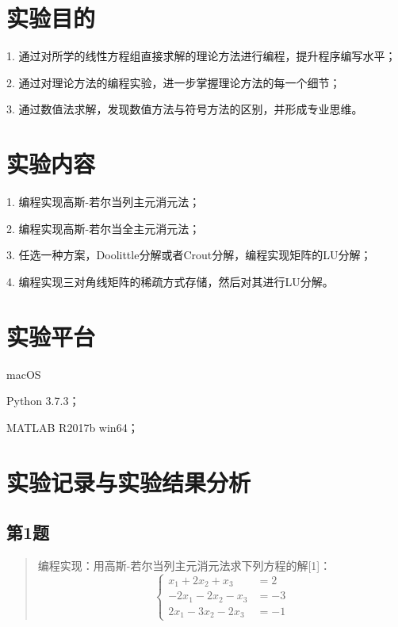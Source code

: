 









\newcommand{\ThisProjectTitle}{线性方程组的直接解法}
\newcommand{\ThisDate}{2017-10-16}
\newcommand{\ThisNo}{No.1}



\section{实验目的}

1. 通过对所学的线性方程组直接求解的理论方法进行编程，提升程序编写水平；

2. 通过对理论方法的编程实验，进一步掌握理论方法的每一个细节；

3. 通过数值法求解，发现数值方法与符号方法的区别，并形成专业思维。

\section{实验内容}

1. 编程实现高斯-若尔当列主元消元法；

2. 编程实现高斯-若尔当全主元消元法；

3. 任选一种方案，Doolittle分解或者Crout分解，编程实现矩阵的LU分解；

4. 编程实现三对角线矩阵的稀疏方式存储，然后对其进行LU分解。

\section{实验平台}

macOS

Python 3.7.3；

MATLAB R2017b win64；

\section{实验记录与实验结果分析}

\subsection{第1题}
\begin{quote}
    {\kaishu
        编程实现：用高斯-若尔当列主元消元法求下列方程的解[1]：
    }
    \begin{equation}
        \left\{\begin{aligned}
            x_{1}+2 x_{2}+x_{3}     &=  2   \\
            -2 x_{1}-2 x_{2}-x_{3}  &=  -3  \\
            2 x_{1}-3 x_{2}-2 x_{3} &=  -1 
        \end{aligned}\right.
    \end{equation}
\end{quote}

